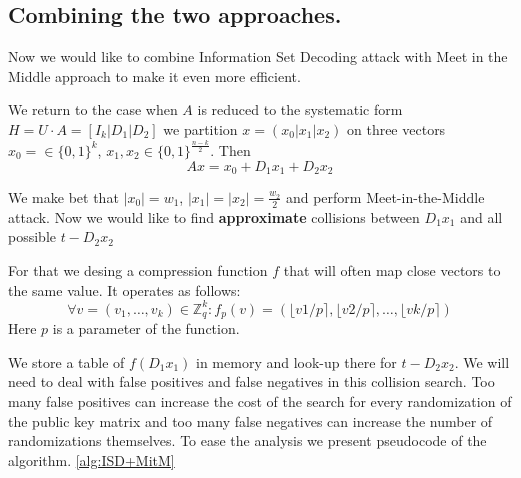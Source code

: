 \documentclass[12pt]{article}
\newcommand{\ZZ}{\mathbb{Z}}
\begin{document}
\subsection{Combining the two approaches.}

Now we would like to combine Information Set Decoding attack with Meet in the Middle approach to make it even more efficient.

We return to the case when $A$ is reduced to the systematic form $H = U \cdot A = [I_{k}| D_1 | D_2]$ we partition $x = (x_0 |x_1 |x_2)$ on three vectors $x_0 = \in \{0,1\}^{k}$, $x_1,x_2 \in \{0,1\}^{\frac{n-k}{2}}$. Then
\[
  Ax = x_0 + D_1x_1 + D_2x_2
\]

We make bet that $|x_0| = w_1$, $|x_1| = |x_2| = \frac{w_2}{2}$ and perform Meet-in-the-Middle attack. Now we would like to find \textbf{approximate} collisions between $D_1x_1$ and all possible $t - D_2x_2$

For that we desing a compression function $f$ that will often map close vectors to the same value. It operates as follows:
\[
\forall v = (v_1, \dots , v_k)\in \ZZ_{q}^{k}: f_{p}(v) = (\lfloor v1/p \rceil, \lfloor v2/p \rceil, \dots, \lfloor vk/p \rceil)
\]
Here $p$ is a parameter of the function.

We store a table of $f(D_1x_1)$ in memory and look-up there for $t - D_2x_2$. We will need to deal with false positives and false negatives in this collision search. Too many false positives can increase the cost of the search for every randomization of the public key matrix and too many false negatives can increase the number of randomizations themselves. To ease the analysis we present pseudocode of the algorithm. \ref{alg:ISD+MitM}
\end{document}
